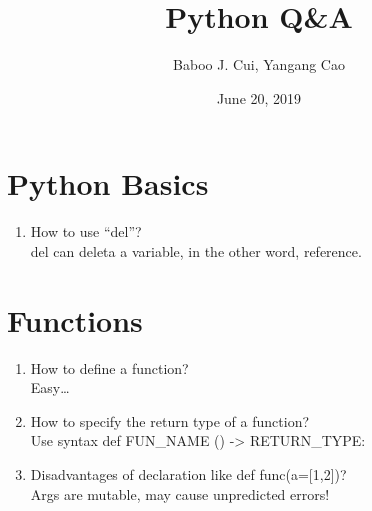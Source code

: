 \documentclass[10pt,a4paper,oneside]{article}
\date{June 20, 2019}
\author{Baboo J. Cui, Yangang Cao}
\title{Python Q\&A}
\begin{document}
\maketitle
\tableofcontents

\newpage

\section{Python Basics}
\begin{enumerate}[1.]
\item How to use ``del''?\\
del can deleta a variable, in the other word, reference.
\end{enumerate}
\section{Functions}
\begin{enumerate}[1.]
\item How to define a function?\\
Easy\dots
\item How to specify the return type of a function?\\
Use syntax def FUN\_NAME () -> RETURN\_TYPE:
\item Disadvantages of declaration like def func(a=[1,2])?\\
Args are mutable, may cause unpredicted errors!
\end{enumerate}
\end{document}
